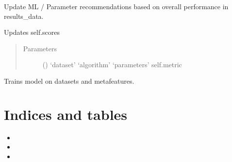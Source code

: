\documentclass[letterpaper,10pt,english]{sphinxmanual}
\begin{document}
\begin{fulllineitems}
\begin{fulllineitems}
\end{fulllineitems}


\begin{fulllineitems}
\label{\detokenize{index:ai.recommender.meta_recommender.MetaRecommender.update}}
Update ML / Parameter recommendations based on overall performance in results\_data.

Updates self.scores
\begin{quote}\begin{description}
\item[{Parameters}] \leavevmode
{} () \textendash{} ‘dataset’
‘algorithm’
‘parameters’
self.metric

\end{description}\end{quote}

\end{fulllineitems}


\begin{fulllineitems}
\label{\detokenize{index:ai.recommender.meta_recommender.MetaRecommender.update_model}}
Trains model on datasets and metafeatures.

\end{fulllineitems}


\end{fulllineitems}



\chapter{Indices and tables}
\label{\detokenize{index:indices-and-tables}}\label{\detokenize{index:welcome-to-pennai-s-documentation}}\begin{itemize}
\item {} 

\item {} 

\item {} 

\end{itemize}
\end{document}
